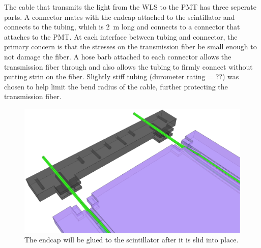 The cable that transmits the light from the WLS to the PMT has three seperate parts.  A connector mates with the endcap attached to the scintillator and connects to the tubing, which is 2~m long and connects to a connector that attaches to the PMT.  At each interface between tubing and connector, the primary concern is that the stresses on the transmission fiber be small enough to not damage the fiber.  A hose barb attached to each connector allows the transmission fiber through and also allows the tubing to firmly connect without putting strin on the fiber.  Slightly stiff tubing (durometer rating = ??) was chosen to help limit the bend radius of the cable, further protecting the transmission fiber.  
\begin{figure}[htp]
\centering
\includegraphics[width=1.0\textwidth]{figures/veto_assembly.eps}
\caption{The endcap will be glued to the scintillator after it is slid into place.}
\label{fig:paddleAssembly}
\end{figure}

